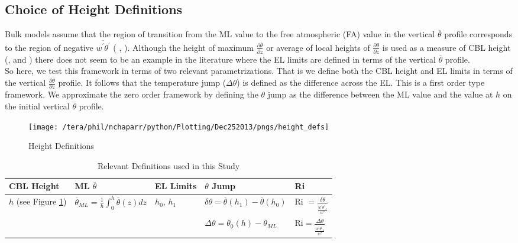 \subsection{Choice of Height Definitions}

Bulk models assume that the region of transition from the \acs{ML} value to the free atmospheric (\acs{FA}) value in the vertical $\overline{\theta}$ profile corresponds to the region of negative $\overline{w^{'}\theta^{'}}$ (\citeauthor{Deardorff79} \cite{Deardorff79}, \citeauthor{FedConzMir04} \cite{FedConzMir04}).  Although the height of maximum $\frac{\partial \overline{\theta}}{\partial z}$ or average of local heights of $\frac{\partial \theta}{\partial z}$ is used as a measure of \acs{CBL} height (\citeauthor{SullMoengStev}, \cite{SullMoengStev} and \citeauthor{GarciaMellado} \cite{GarciaMellado}) there does not seem to be an example in the literature where the \acs{EL} limits are defined in terms of the vertical $\overline{\theta}$ profile.\\

So here, we test this framework in terms of two relevant parametrizations.  That is we define both the \acs{CBL} height and \acs{EL} limits in terms of the vertical $\frac{\partial \overline{\theta}}{\partial z}$ profile. It follows that the temperature jump ($\Delta \theta$) is defined as the difference across the \acs{EL}.  This is a first order type framework.  We approximate the zero order framework by defining the $\theta$ jump as the difference between the \acs{ML} value and the value at $h$ on the initial vertical $\overline{\theta}$ profile.
       
\begin{figure}[htbp]
    \centering
    \texttt{[image: /tera/phil/nchaparr/python/Plotting/Dec252013/pngs/height\_defs]}
    \caption{Height Definitions}
    \label{fig:hdefs}   %
\end{figure}

\begin{table}[htbp]
    \begin{center}
    \begin{tabular}{| p{2cm}| p{2cm} | p{2cm} | p{2cm}| p{2cm}| }
    \hline
      \acs{CBL} Height & \acs{ML} $\overline{\theta}$ & \acs{EL} Limits & $\theta$ Jump & \acs{Ri} \\ \hline 
       $h$ (see Figure \ref{fig:hdefs})& $\overline{\theta}_{ML} = \frac{1}{h}\int^{h}_{0}\overline{\theta}(z)dz$ & $h_{0}$, $h_{1}$ & $\delta \theta=\overline{\theta}(h_{1})-\overline{\theta}(h_{0})$ & \acs{Ri} $=\frac{\delta \theta}{\frac{\overline{w^{'}\theta^{'}}_{s}}{w^{*}}}$  \\ \hline 
       & & &$\Delta \theta = \overline{\theta}_{0}(h)- \overline{\theta}_{ML}$ & \acs{Ri}$=\frac{\Delta \theta}{\frac{\overline{w^{'}\theta^{'}}_{s}}{w^{*}}}$ \\ \hline
      \end{tabular}
\caption{Relevant Definitions used in this Study}
\label{table:reldefs}   
\end{center}    
\end{table}

